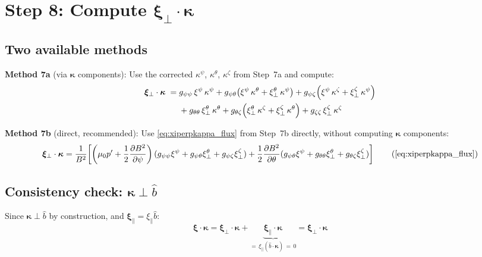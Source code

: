 \documentclass[12pt,a4paper]{article}
\newcommand{\bxi}{\boldsymbol{\xi}}
\begin{document}
\section{Step 8: Compute $\bxi_\perp\cdot\bm{\kappa}$}

\subsection{Two available methods}

\textbf{Method 7a} (via $\bm{\kappa}$ components): Use the corrected $\kappa^\psi$, $\kappa^\theta$, $\kappa^\zeta$ from Step~7a and compute:
\begin{align}
    \bxi_\perp\cdot\bm{\kappa} \;=\;&
      g_{\psi\psi}\,\xi^\psi\,\kappa^\psi
    + g_{\psi\theta}\!\left(\xi^\psi\,\kappa^\theta + \xi^\theta_\perp\,\kappa^\psi\right)
    + g_{\psi\zeta}\!\left(\xi^\psi\,\kappa^\zeta + \xi^\zeta_\perp\,\kappa^\psi\right) \notag\\
    &+ g_{\theta\theta}\,\xi^\theta_\perp\,\kappa^\theta
    + g_{\theta\zeta}\!\left(\xi^\theta_\perp\,\kappa^\zeta + \xi^\zeta_\perp\,\kappa^\theta\right)
    + g_{\zeta\zeta}\,\xi^\zeta_\perp\,\kappa^\zeta
    \label{eq:xiperpkappa_full}
\end{align}

\textbf{Method 7b} (direct, recommended): Use \eqref{eq:xiperpkappa_flux} from Step~7b directly, without computing $\bm{\kappa}$ components:
\begin{equation}
    \bxi_\perp\cdot\bm{\kappa} = \frac{1}{B^2}\!\left[
    \left(\mu_0 p' + \frac{1}{2}\frac{\partial B^2}{\partial\psi}\right)
    (g_{\psi\psi}\xi^\psi + g_{\psi\theta}\xi^\theta_\perp + g_{\psi\zeta}\xi^\zeta_\perp)
    + \frac{1}{2}\frac{\partial B^2}{\partial\theta}
    (g_{\psi\theta}\xi^\psi + g_{\theta\theta}\xi^\theta_\perp + g_{\theta\zeta}\xi^\zeta_\perp)
    \right]
    \tag{\ref{eq:xiperpkappa_flux}}
\end{equation}

\subsection{Consistency check: $\bm{\kappa}\perp\hat{b}$}

Since $\bm{\kappa}\perp\hat{b}$ by construction, and $\bxi_\parallel = \xi_\parallel\hat{b}$:
\begin{equation}
    \bxi\cdot\bm{\kappa} = \bxi_\perp\cdot\bm{\kappa} + \underbrace{\bxi_\parallel\cdot\bm{\kappa}}_{=\,\xi_\parallel(\hat{b}\cdot\bm{\kappa})\,=\,0} = \bxi_\perp\cdot\bm{\kappa}
    \label{eq:kappa_perp_xi}
\end{equation}
\end{document}
